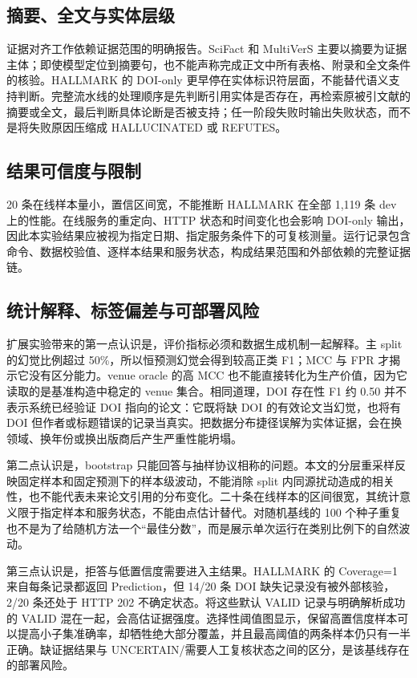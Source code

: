 \documentclass[UTF8,a4paper,11pt]{ctexart}
\begin{document}
\subsection{摘要、全文与实体层级}

证据对齐工作依赖证据范围的明确报告。SciFact 和 MultiVerS 主要以摘要为证据主体；即使模型定位到摘要句，也不能声称完成正文中所有表格、附录和全文条件的核验。HALLMARK 的 DOI-only 更早停在实体标识符层面，不能替代语义支持判断。完整流水线的处理顺序是先判断引用实体是否存在，再检索原被引文献的摘要或全文，最后判断具体论断是否被支持；任一阶段失败时输出失败状态，而不是将失败原因压缩成 HALLUCINATED 或 REFUTES。

\subsection{结果可信度与限制}

20 条在线样本量小，置信区间宽，不能推断 HALLMARK 在全部 1,119 条 dev 上的性能。在线服务的重定向、HTTP 状态和时间变化也会影响 DOI-only 输出，因此本实验结果应被视为指定日期、指定服务条件下的可复核测量。运行记录包含命令、数据校验值、逐样本结果和服务状态，构成结果范围和外部依赖的完整证据链。

\subsection{统计解释、标签偏差与可部署风险}

扩展实验带来的第一点认识是，评价指标必须和数据生成机制一起解释。主 split 的幻觉比例超过 50\%，所以恒预测幻觉会得到较高正类 F1；MCC 与 FPR 才揭示它没有区分能力。venue oracle 的高 MCC 也不能直接转化为生产价值，因为它读取的是基准构造中稳定的 venue 集合。相同道理，DOI 存在性 F1 约 0.50 并不表示系统已经验证 DOI 指向的论文：它既将缺 DOI 的有效论文当幻觉，也将有 DOI 但作者或标题错误的记录当真实。把数据分布捷径误解为实体证据，会在换领域、换年份或换出版商后产生严重性能坍塌。

第二点认识是，bootstrap 只能回答与抽样协议相称的问题。本文的分层重采样反映固定样本和固定预测下的样本级波动，不能消除 split 内同源扰动造成的相关性，也不能代表未来论文引用的分布变化。二十条在线样本的区间很宽，其统计意义限于指定样本和服务状态，不能由点估计替代。对随机基线的 100 个种子重复也不是为了给随机方法一个“最佳分数”，而是展示单次运行在类别比例下的自然波动。

第三点认识是，拒答与低置信度需要进入主结果。HALLMARK 的 Coverage=1 来自每条记录都返回 Prediction，但 14/20 条 DOI 缺失记录没有被外部核验，2/20 条还处于 HTTP 202 不确定状态。将这些默认 VALID 记录与明确解析成功的 VALID 混在一起，会高估证据强度。选择性阈值图显示，保留高置信度样本可以提高小子集准确率，却牺牲绝大部分覆盖，并且最高阈值的两条样本仍只有一半正确。缺证据结果与 UNCERTAIN/需要人工复核状态之间的区分，是该基线存在的部署风险。
\end{document}
